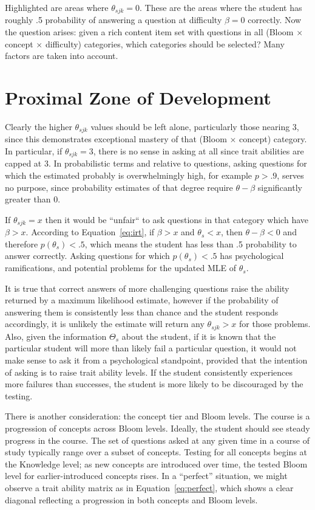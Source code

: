 Highlighted are areas where $\theta_{sjk} = 0$. These are the areas where the
student has roughly .5 probability of answering a question at difficulty
$\beta=0$ correctly.  Now the question arises: given a rich content item set
with questions in all (Bloom $\times$ concept $\times$ difficulty) categories,
which categories should be selected?  Many factors are taken into account.

\section{Proximal Zone of Development}

Clearly the higher $\theta_{sjk}$ values should be left alone, particularly
those nearing 3, since this demonstrates exceptional mastery of that (Bloom
$\times$ concept) category.  In particular, if $\theta_{sjk} = 3$, there is no
sense in asking at all since trait abilities are capped at 3.  In probabilistic
terms and relative to questions, asking questions for which the estimated
probably is overwhelmingly high, for example $p > .9$, serves no purpose, since
probability estimates of that degree require $\theta-\beta$ significantly
greater than 0.

If $\theta_{sjk} = x$ then it would be ``unfair`` to ask questions in that
category which have $\beta > x$.  According to Equation~\ref{eq:irt}, if $\beta
> x$ and $\theta_s < x$, then $\theta-\beta < 0$ and therefore $p(\theta_s) <
.5$, which means the student has less than .5 probability to answer correctly.
Asking questions for which $p(\theta_s) < .5$ has psychological ramifications,
and potential problems for the updated MLE of $\theta_s$.

It is true that correct answers of more challenging questions raise the ability
returned by a maximum likelihood estimate, however if the probability of
answering them is consistently less than chance and the student responds
accordingly, it is unlikely the estimate will return any $\theta_{sjk} > x$ for
those problems.  Also, given the information $\Theta_s$ about the student, if
it is known that the particular student will more than likely fail a particular
question, it would not make sense to ask it from a psychological standpoint,
provided that the intention of asking is to raise trait ability levels.  If the
student consistently experiences more failures than successes, the student is
more likely to be discouraged by the testing. 

There is another consideration: the concept tier and Bloom levels.  The course
is a progression of concepts across Bloom levels.  Ideally, the student should
see steady progress in the course.  The set of questions asked at any given
time in a course of study typically range over a subset of concepts.  Testing
for all concepts begins at the Knowledge level; as new concepts are introduced
over time, the tested Bloom level for earlier-introduced concepts rises.  In a
``perfect'' situation, we might observe a trait ability matrix as in
Equation~\ref{eq:perfect}, which shows a clear diagonal reflecting a
progression in both concepts and Bloom levels.  

